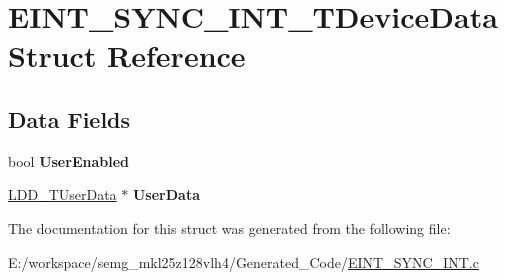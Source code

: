 \hypertarget{struct_e_i_n_t___s_y_n_c___i_n_t___t_device_data}{\section{E\-I\-N\-T\-\_\-\-S\-Y\-N\-C\-\_\-\-I\-N\-T\-\_\-\-T\-Device\-Data Struct Reference}
\label{struct_e_i_n_t___s_y_n_c___i_n_t___t_device_data}
}
\subsection*{Data Fields}
\begin{DoxyCompactItemize}
\item 
\hypertarget{struct_e_i_n_t___s_y_n_c___i_n_t___t_device_data_a3dd89ffc748fe8e7be597034b279faea}{bool {\bfseries User\-Enabled}}\label{struct_e_i_n_t___s_y_n_c___i_n_t___t_device_data_a3dd89ffc748fe8e7be597034b279faea}

\item 
\hypertarget{struct_e_i_n_t___s_y_n_c___i_n_t___t_device_data_a940bcef0e9fcb77b22592284b49e133d}{\hyperlink{group___p_e___types__module_ga0b66a73f87238a782318aa0be7578e35}{L\-D\-D\-\_\-\-T\-User\-Data} $\ast$ {\bfseries User\-Data}}\label{struct_e_i_n_t___s_y_n_c___i_n_t___t_device_data_a940bcef0e9fcb77b22592284b49e133d}

\end{DoxyCompactItemize}


The documentation for this struct was generated from the following file\-:\begin{DoxyCompactItemize}
\item 
E\-:/workspace/semg\-\_\-mkl25z128vlh4/\-Generated\-\_\-\-Code/\hyperlink{_e_i_n_t___s_y_n_c___i_n_t_8c}{E\-I\-N\-T\-\_\-\-S\-Y\-N\-C\-\_\-\-I\-N\-T.\-c}\end{DoxyCompactItemize}
